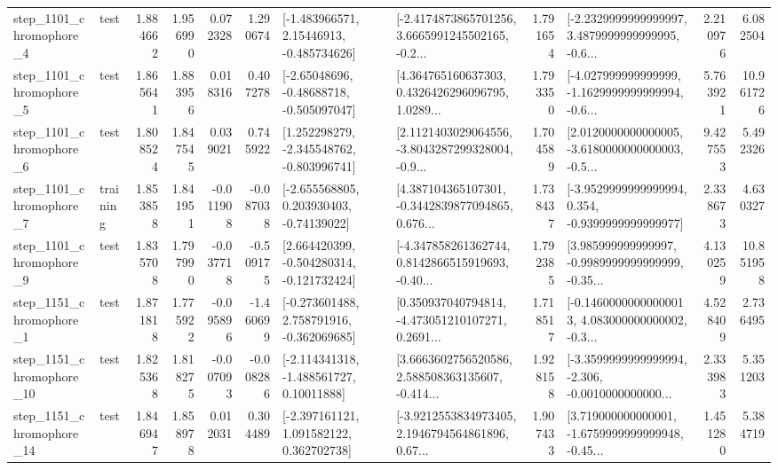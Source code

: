 \begin{tabular}{llrrrrllrlrr}
  step\_1101\_chromophore\_4 &      test &      1.884662 &    1.956990 &      0.072328 &  1.290674 &    [-1.483966571, 2.15446913, -0.485734626] &  [-2.4174873865701256, 3.6665991245502165, -0.2... &       1.791654 &  [-2.2329999999999997, 3.4879999999999995, -0.6... &            2.210976 &          6.082504 \\
  step\_1101\_chromophore\_5 &      test &      1.865641 &    1.883956 &      0.018316 &  0.407278 &    [-2.65048696, -0.48688718, -0.505097047] &  [4.364765160637303, 0.4326426296096795, 1.0289... &       1.793350 &  [-4.027999999999999, -1.1629999999999994, -0.6... &            5.763921 &         10.961726 \\
  step\_1101\_chromophore\_6 &      test &      1.808524 &    1.847545 &      0.039021 &  0.745922 &   [1.252298279, -2.345548762, -0.803996741] &  [2.1121403029064556, -3.8043287299328004, -0.9... &       1.704589 &  [2.0120000000000005, -3.6180000000000003, -0.5... &            9.427553 &          5.492326 \\
  step\_1101\_chromophore\_7 &  training &      1.853858 &    1.841951 &     -0.011908 & -0.087038 &    [-2.655568805, 0.203930403, -0.74139022] &  [4.387104365107301, -0.3442839877094865, 0.676... &       1.738437 &  [-3.9529999999999994, 0.354, -0.9399999999999977] &            2.338673 &          4.630327 \\
  step\_1101\_chromophore\_9 &      test &      1.835708 &    1.797990 &     -0.037718 & -0.509175 &   [2.664420399, -0.504280314, -0.121732424] &  [-4.347858261362744, 0.8142866515919693, -0.40... &       1.792385 &  [3.985999999999997, -0.9989999999999999, -0.35... &            4.130259 &         10.851958 \\
  step\_1151\_chromophore\_1 &      test &      1.871818 &    1.775922 &     -0.095896 & -1.460699 &   [-0.273601488, 2.758791916, -0.362069685] &  [0.350937040794814, -4.473051210107271, 0.2691... &       1.718517 &  [-0.14600000000000013, 4.083000000000002, -0.3... &            4.528409 &          2.736495 \\
 step\_1151\_chromophore\_10 &      test &      1.825368 &    1.818275 &     -0.007093 & -0.008286 &    [-2.114341318, -1.488561727, 0.10011888] &  [3.6663602756520586, 2.588508363135607, -0.414... &       1.928158 &  [-3.3599999999999994, -2.306, -0.0010000000000... &            2.333983 &          5.351203 \\
 step\_1151\_chromophore\_14 &      test &      1.846947 &    1.858978 &      0.012031 &  0.304489 &    [-2.397161121, 1.091582122, 0.362702738] &  [-3.9212553834973405, 2.1946794564861896, 0.67... &       1.907433 &  [3.719000000000001, -1.6759999999999948, -0.45... &            1.451280 &          5.384719 \\

\end{tabular}

